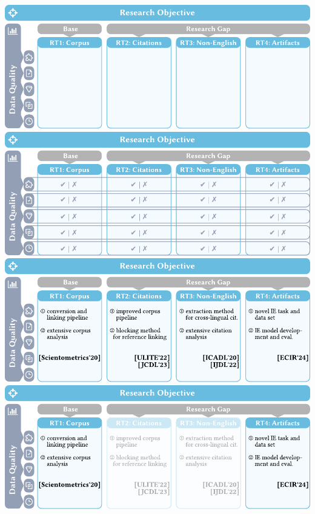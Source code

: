 \documentclass[en,16:9,smallfoot]{sdqbeamer}
\begin{document}
\begin{frame}[plain]
\begin{overprint}
            \centering\includegraphics[width=\textwidth]{imgs/objective_grid_and_contrib_4}
            \centering\includegraphics[width=\textwidth]{imgs/objective_grid_and_contrib_5}
            \centering\includegraphics[width=\textwidth]{imgs/objective_grid_and_contrib_6}
            \centering\includegraphics[width=\textwidth]{imgs/objective_grid_and_contrib_7}
       \end{overprint}
   \end{frame}
\end{document}
